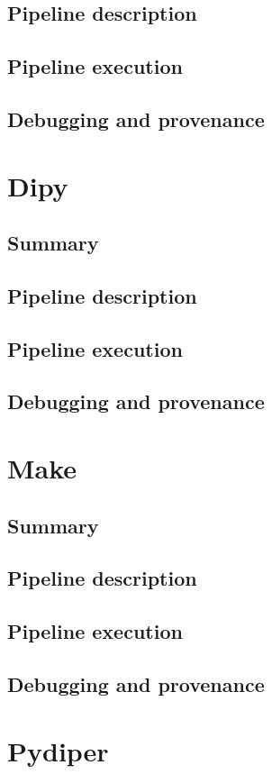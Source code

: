 \documentclass{report}
\begin{document}
        \subsection{Pipeline description}
        \subsection{Pipeline execution}
        \subsection{Debugging and provenance}
    \section{Dipy}
        \subsection{Summary}
        \subsection{Pipeline description}
        \subsection{Pipeline execution}
        \subsection{Debugging and provenance}
    \section{Make}
        \subsection{Summary}
        \subsection{Pipeline description}
        \subsection{Pipeline execution}
        \subsection{Debugging and provenance}
    \section{Pydiper}
\end{document}
